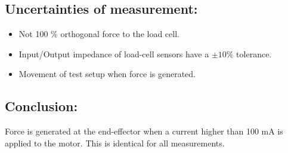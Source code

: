 \subsection*{Uncertainties of measurement:}
\begin{itemize}
\item Not 100 \% orthogonal force to the load cell.
\item Input/Output impedance of load-cell sensors have a $\pm 10 \%$ tolerance.
\item Movement of test setup when force is generated.
\end{itemize}

\subsection*{Conclusion:}
Force is generated at the end-effector when a current higher than 100 mA is applied to the motor. This is identical for all measurements. 
